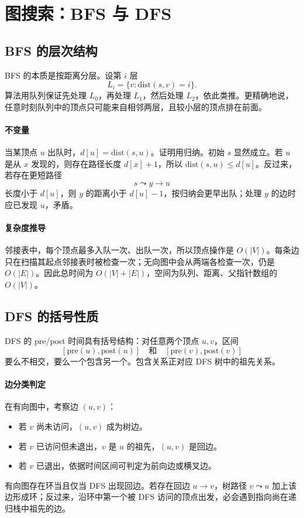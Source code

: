 \documentclass[UTF8,openany,12pt]{ctexbook}
\theoremstyle{remark}
\begin{document}
\section{图搜索：BFS 与 DFS}
\subsection{BFS 的层次结构}
BFS 的本质是按距离分层。设第 $i$ 层
\[
L_i=\{v:\mathrm{dist}(s,v)=i\}.
\]
算法用队列保证先处理 $L_0$，再处理 $L_1$，然后处理 $L_2$，依此类推。更精确地说，任意时刻队列中的顶点只可能来自相邻两层，且较小层的顶点排在前面。

\paragraph{不变量}
当某顶点 $u$ 出队时，$d[u]=\mathrm{dist}(s,u)$。证明用归纳。初始 $s$ 显然成立。若 $u$ 是从 $x$ 发现的，则存在路径长度 $d[x]+1$，所以 $\mathrm{dist}(s,u)\le d[u]$。反过来，若存在更短路径
\[
s\leadsto y\to u
\]
长度小于 $d[u]$，则 $y$ 的距离小于 $d[u]-1$，按归纳会更早出队；处理 $y$ 的边时应已发现 $u$，矛盾。

\paragraph{复杂度推导}
邻接表中，每个顶点最多入队一次、出队一次，所以顶点操作是 $O(|V|)$。每条边只在扫描其起点邻接表时被检查一次；无向图中会从两端各检查一次，仍是 $O(|E|)$。因此总时间为 $O(|V|+|E|)$，空间为队列、距离、父指针数组的 $O(|V|)$。

\subsection{DFS 的括号性质}
DFS 的 pre/post 时间具有括号结构：对任意两个顶点 $u,v$，区间
\[
[\mathrm{pre}(u),\mathrm{post}(u)]
\quad\text{和}\quad
[\mathrm{pre}(v),\mathrm{post}(v)]
\]
要么不相交，要么一个包含另一个。包含关系正对应 DFS 树中的祖先关系。

\paragraph{边分类判定}
在有向图中，考察边 $(u,v)$：
\begin{itemize}
  \item 若 $v$ 尚未访问，$(u,v)$ 成为树边。
  \item 若 $v$ 已访问但未退出，$v$ 是 $u$ 的祖先，$(u,v)$ 是回边。
  \item 若 $v$ 已退出，依据时间区间可判定为前向边或横叉边。
\end{itemize}
有向图存在环当且仅当 DFS 出现回边。若存在回边 $u\to v$，树路径 $v\leadsto u$ 加上该边形成环；反过来，沿环中第一个被 DFS 访问的顶点出发，必会遇到指向尚在递归栈中祖先的边。
\end{document}
